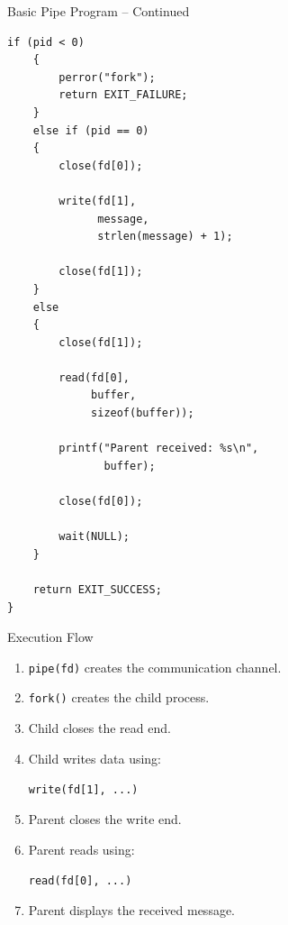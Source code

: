 \documentclass[aspectratio=169]{beamer}
\begin{document}
\begin{frame}[fragile]{Basic Pipe Program -- Continued}

\begin{lstlisting}[style=cstyle]
    if (pid < 0)
    {
        perror("fork");
        return EXIT_FAILURE;
    }
    else if (pid == 0)
    {
        close(fd[0]);

        write(fd[1],
              message,
              strlen(message) + 1);

        close(fd[1]);
    }
    else
    {
        close(fd[1]);

        read(fd[0],
             buffer,
             sizeof(buffer));

        printf("Parent received: %s\n",
               buffer);

        close(fd[0]);

        wait(NULL);
    }

    return EXIT_SUCCESS;
}
\end{lstlisting}

\end{frame}

\begin{frame}{Execution Flow}

\begin{enumerate}

    \item \texttt{pipe(fd)} creates the communication channel.

    \item \texttt{fork()} creates the child process.

    \item Child closes the read end.

    \item Child writes data using:
    \begin{center}
    \texttt{write(fd[1], ...)}
    \end{center}

    \item Parent closes the write end.

    \item Parent reads using:
    \begin{center}
    \texttt{read(fd[0], ...)}
    \end{center}

    \item Parent displays the received message.

\end{enumerate}

\end{frame}
\end{document}
